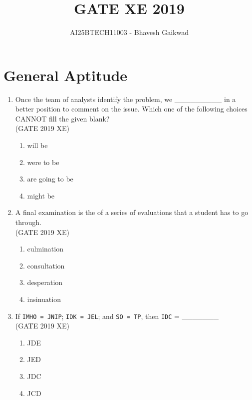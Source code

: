 \documentclass[journal,12pt,onecolumn]{IEEEtran}
\begin{document}
\title{GATE XE 2019}
\author{AI25BTECH11003 - Bhavesh Gaikwad}
\maketitle


\section*{General Aptitude}
\bigskip

\begin{enumerate}


\item Once the team of analysts identify the problem, we \_\_\_\_\_\_\_\_\_ in a better position to comment on the issue. Which one of the following choices CANNOT fill the given blank?\\
\hfill{(GATE 2019 XE)} 
\begin{multicols}{2}
\begin{enumerate}
\item will be
\item were to be
\item are going to be
\item might be
\end{enumerate}
\end{multicols}

\item A final examination is the \underline{\hspace{2cm}} of a series of evaluations that a student has to go through.\\
\hfill{(GATE 2019 XE)} 
\begin{multicols}{2}
\begin{enumerate}
\item culmination
\item consultation
\item desperation
\item insinuation
\end{enumerate}
\end{multicols}

\item If \texttt{IMHO = JNIP}; \texttt{IDK = JEL}; and \texttt{SO = TP}, then \texttt{IDC} = \_\_\_\_\_\_\_\\
\hfill{(GATE 2019 XE)} 
\begin{multicols}{2}
\begin{enumerate}
\item JDE
\item JED
\item JDC
\item JCD
\end{enumerate}
\end{multicols}


\end{enumerate}
\end{document}
